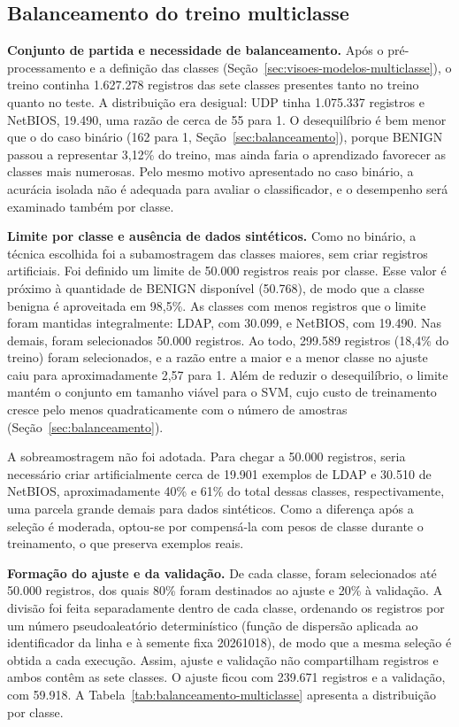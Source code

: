 \documentclass[
    12pt,                %
    openright,           %
    oneside,             %
    a4paper,             %
    english,             %
    brazil               %
]{abntex2}
\begin{document}
\subsection{Balanceamento do treino multiclasse}
\label{sec:balanceamento-multiclasse}
 
\textbf{Conjunto de partida e necessidade de balanceamento.} Após o pré-processamento e a definição das classes (Seção~\ref{sec:visoes-modelos-multiclasse}), o treino continha 1.627.278 registros das sete classes presentes tanto no treino quanto no teste. A distribuição era desigual: UDP tinha 1.075.337 registros e NetBIOS, 19.490, uma razão de cerca de 55 para 1. O desequilíbrio é bem menor que o do caso binário (162 para 1, Seção~\ref{sec:balanceamento}), porque BENIGN passou a representar 3,12\% do treino, mas ainda faria o aprendizado favorecer as classes mais numerosas. Pelo mesmo motivo apresentado no caso binário, a acurácia isolada não é adequada para avaliar o classificador, e o desempenho será examinado também por classe.
 
\textbf{Limite por classe e ausência de dados sintéticos.} Como no binário, a técnica escolhida foi a subamostragem das classes maiores, sem criar registros artificiais. Foi definido um limite de 50.000 registros reais por classe. Esse valor é próximo à quantidade de BENIGN disponível (50.768), de modo que a classe benigna é aproveitada em 98,5\%. As classes com menos registros que o limite foram mantidas integralmente: LDAP, com 30.099, e NetBIOS, com 19.490. Nas demais, foram selecionados 50.000 registros. Ao todo, 299.589 registros (18,4\% do treino) foram selecionados, e a razão entre a maior e a menor classe no ajuste caiu para aproximadamente 2,57 para 1. Além de reduzir o desequilíbrio, o limite mantém o conjunto em tamanho viável para o SVM, cujo custo de treinamento cresce pelo menos quadraticamente com o número de amostras (Seção~\ref{sec:balanceamento}).
 
A sobreamostragem não foi adotada. Para chegar a 50.000 registros, seria necessário criar artificialmente cerca de 19.901 exemplos de LDAP e 30.510 de NetBIOS, aproximadamente 40\% e 61\% do total dessas classes, respectivamente, uma parcela grande demais para dados sintéticos. Como a diferença após a seleção é moderada, optou-se por compensá-la com pesos de classe durante o treinamento, o que preserva exemplos reais.
 
\textbf{Formação do ajuste e da validação.} De cada classe, foram selecionados até 50.000 registros, dos quais 80\% foram destinados ao ajuste e 20\% à validação. A divisão foi feita separadamente dentro de cada classe, ordenando os registros por um número pseudoaleatório determinístico (função de dispersão aplicada ao identificador da linha e à semente fixa 20261018), de modo que a mesma seleção é obtida a cada execução. Assim, ajuste e validação não compartilham registros e ambos contêm as sete classes. O ajuste ficou com 239.671 registros e a validação, com 59.918. A Tabela~\ref{tab:balanceamento-multiclasse} apresenta a distribuição por classe.
 
\end{document}
